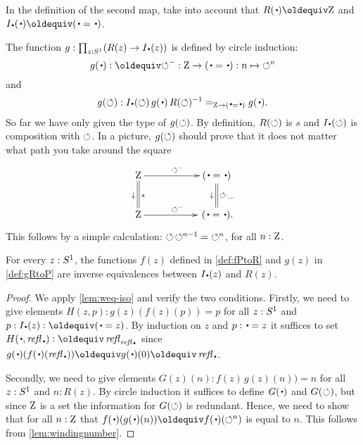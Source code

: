 In the definition of the second map, 
take into account that $R(\base)\jdeq \zet$ and $\uc{\base}(\base) \jdeq (\base=\base)$.

\begin{definition}\label{def:gRtoP}
The function $g:\prod_{z:\Sc}(R(z)\to \uc{\base}(z))$ is 
defined by circle induction: 
\[
g(\base)\defeq {\Sloop^{-}}:\zet\to(\base=\base) : n \mapsto {\Sloop^n}
\]
and 
\[
g(\Sloop): \uc{\base}(\Sloop)\, g(\base)\,R(\Sloop)^{-1}=_{\zet\to (\base=\base)} g(\base).
\]
So far we have only given the type of $g(\circlearrowleft)$. By definition, $R(\circlearrowleft)$ is $s$
and $\uc{\base}(\Sloop)$ is composition with $\circlearrowleft$.
In a picture, $g(\circlearrowleft)$ should prove that it does not matter what 
path you take around the square
$$\xymatrix{\zet\ar[rr]^{\Sloop^-}\ar@{=}[d]^s_\downarrow
 &&(\base=\base)\ar@{=}[d]^{\Sloop\cdot\_}_\downarrow\\
  \zet\ar[rr]^{\Sloop^-}&&\,(\base=\base).}
$$
This follows by a simple calculation: ${\circlearrowleft\,\circlearrowleft^{n-1}} = {\circlearrowleft^n}$, 
for all $n:\mathrm{Z}$. 
\end{definition}


\begin{lemma}
  \label{lem:univisexp}
For every $z:{S^1}$, the functions $f(z)$ defined in \cref{def:fPtoR} 
and $g(z)$ in \cref{def:gRtoP} are inverse equivalences between
$\uc{\base}(z)$ and $R(z)$.
\end{lemma}
\begin{proof}
We apply \cref{lem:weq-iso} and verify the two conditions.
  Firstly, we need to give elements $H(z,p):g(z)(f(z)(p))=p$
for all $z:{S^1}$ and $p:\uc{\base}(z)\defeq(\base=z)$. 
By induction on $z$ and $p:\base=z$ it suffices to set 
$H(\base,\refl\base)\defeq\refl{\refl{\base}}$ since
$g(\base)(f(\base)(\refl{\base}))\jdeq g(\base)(0)\jdeq\refl{\base}$.

Secondly, we need to give elements $G(z)(n):f(z)\,g(z)(n))=n$
for all $z:{S^1}$ and $n: R(z)$.
By circle induction it suffices to define $G(\base)$ and $G(\circlearrowleft)$,
but since $\mathrm{Z}$ is a set the information for $G(\circlearrowleft)$ is redundant.
Hence, we need to show that for all $n:\mathrm{Z}$ that 
$f(\base)(g(\base)(n))\jdeq  f(\base)(\Sloop^n)$ is equal to $n$.  
This follows from \cref{lem:windingnumber}. 
\end{proof}


